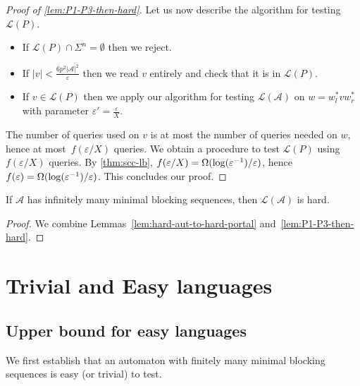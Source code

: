 \documentclass[letterpaper, USenglish, cleveref, autoref, thm-restate, numberwithinsect]{lipics-v2021}
\theoremstyle{theorem}
\theoremstyle{definition}
\newcommand{\Aa}{\mathcal{A}}
\newcommand{\eps}{\varepsilon}
\newcommand{\lang}[1]{\mathcal{L}(#1)}
\newcommand{\epslogeps}[1][]
{\ifthenelse{\equal{#1}{}}{\log(\eps^{-1})/\eps}{\log^{ #1 }(\eps^{-1})/\eps}}
\begin{document}
\begin{proof}[Proof of \cref{lem:P1-P3-then-hard}]
	Let us now describe the algorithm for testing $\lang{P}$.
	\begin{itemize}
		\item If $\lang{P} \cap \Sigma^{n} = \emptyset$ then we reject.
		
		\item If $|v| < \frac{6p^2|\Aa|^2}{\eps}$ then we read $v$ entirely and check that it is in $\lang{P}$.
		
		\item If $v \in \lang{P}$ then we apply our algorithm for testing $\lang{\Aa}$ on $w = w_l^* v w_r^*$ with parameter $\eps' =\frac{\eps}{X}$.
	\end{itemize}
	
	The number of queries used on $v$ is at most the number of queries needed on $w$, hence at most~$f(\eps / X)$ queries.
	We obtain a procedure to test $\lang{P}$ using $f(\eps/X)$ queries.
	By \cref{thm:scc-lb}, $f(\eps/X) = \Omega(\epslogeps)$, hence $f(\eps) = \Omega(\epslogeps)$.
	This concludes our proof.
\end{proof}

\begin{proposition}
		If $\Aa$ has infinitely many minimal blocking sequences, 
		then $\lang{\Aa}$ is hard.
\end{proposition}
\begin{proof}
	We combine Lemmas~\ref{lem:hard-aut-to-hard-portal} and~\ref{lem:P1-P3-then-hard}.
\end{proof} 
\section{Trivial and Easy languages}
\label{sec:trivial-easy}
\subsection{Upper bound for easy languages}

We first establish that an automaton with finitely many minimal blocking sequences is easy (or trivial) to test.
\end{document}
